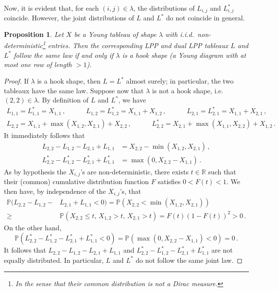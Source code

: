 \documentclass[a4paper,reqno,12pt]{amsart}
\theoremstyle{plain}
\newtheorem{prop}[thm]{Proposition}
\theoremstyle{definition}
\newcommand{\R}{\mathbb{R}}
\renewcommand{\P}{\mathbb{P}}
\newcommand{\1}{\mathbbm{1}}
\begin{document}
Now, it is evident that, for each $(i,j)\in \lambda$, the distributions of $L_{i,j}$ and $L^*_{i,j}$ coincide.
However, the joint distributions of $L$ and $L^*$ do not coincide in general.
\begin{prop}
\label{prop:LPP&dualLPP_joint}
Let $X$ be a Young tableau of shape $\lambda$ with i.i.d.\ non-deterministic\footnote{In the sense that their common distribution is not a Dirac measure.} entries.
Then the corresponding LPP and dual LPP tableaux $L$ and $L^*$ follow the same law if and only if $\lambda$ is a hook shape (a Young diagram with at most one row of length $> 1$).
\end{prop}
\begin{proof}
If $\lambda$ is a hook shape, then $L=L^*$ almost surely; in particular, the two tableaux have the same law.
Suppose now that $\lambda$ is not a hook shape, i.e.\ $(2,2)\in \lambda$.
By definition of $L$ and $L^*$, we have
\begin{gather*}
L_{1,1} = L^*_{1,1} = X_{1,1} \, , \qquad\quad
L_{1,2} = L^*_{1,2} = X_{1,1} + X_{1,2} \, , \qquad\quad
L_{2,1} = L^*_{2,1} = X_{1,1} + X_{2,1} \, , \\
L_{2,2} = X_{1,1} + \max(X_{1,2},X_{2,1}) + X_{2,2} \, , \qquad\quad
L^*_{2,2} = X_{2,1} + \max(X_{1,1},X_{2,2}) + X_{1,2} \, .
\end{gather*}
It immediately follows that
\begin{align*}
L_{2,2} - L_{1,2} - L_{2,1} + L_{1,1}
&= X_{2,2} - \min(X_{1,2},X_{2,1}) \, , \\
L^*_{2,2} - L^*_{1,2} - L^*_{2,1} + L^*_{1,1}
&= \max(0,X_{2,2}-X_{1,1}) \, .
\end{align*}
As by hypothesis the $X_{i,j}$'s are non-deterministic, there exists $t\in\R$ such that their (common) cumulative distribution function $F$ satisfies $0<F(t)<1$.
We then have, by independence of the $X_{i,j}$'s, that
\[
\begin{split}
\P(L_{2,2} - L_{1,2} - & L_{2,1} + L_{1,1} <0)
= \P(X_{2,2} < \min(X_{1,2},X_{2,1})) \\
\geq \, &\P(X_{2,2} \leq t, \, X_{1,2} > t, \, X_{2,1} > t)
= F(t) (1-F(t))^2 >0 \, .
\end{split}
\]
On the other hand,
\[
\P(L^*_{2,2} - L^*_{1,2} - L^*_{2,1} + L^*_{1,1} <0)
= \P(\max(0,X_{2,2}-X_{1,1})<0) =0 \, .
\]
It follows that $L_{2,2} - L_{1,2} - L_{2,1} + L_{1,1}$ and $L^*_{2,2} - L^*_{1,2} - L^*_{2,1} + L^*_{1,1}$ are not equally distributed.
In particular, $L$ and $L^*$ do not follow the same joint law.
\end{proof}
\end{document}

